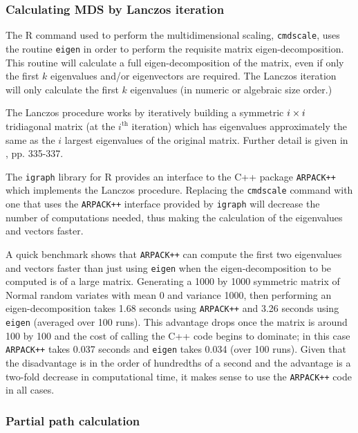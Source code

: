 \subsubsection{Calculating MDS by Lanczos iteration}

The \textsf{R} command used to perform the multidimensional scaling, \texttt{cmdscale}, uses the routine \texttt{eigen} in order to perform the requisite matrix eigen-decomposition. This routine will calculate a full eigen-decomposition of the matrix, even if only the first $k$ eigenvalues and/or eigenvectors are required. The Lanczos iteration will only calculate the first $k$ eigenvalues (in numeric or algebraic size order.)

The  Lanczos procedure works by iteratively building a symmetric $i\times i$ tridiagonal matrix (at the $i^{\text{th}}$ iteration) which has eigenvalues approximately the same as the $i$ largest eigenvalues of the original matrix. Further detail is given in \cite{simonbook}, pp. 335-337.

The \texttt{igraph} library for \textsf{R} provides an interface to the C++ package \texttt{ARPACK++} which implements the Lanczos procedure. Replacing the \texttt{cmdscale} command with one that uses the \texttt{ARPACK++} interface provided by \texttt{igraph} will decrease the number of computations needed, thus making the calculation of the eigenvalues and vectors faster.

A quick benchmark shows that \texttt{ARPACK++} can compute the first two eigenvalues and vectors faster than just using \texttt{eigen} when the eigen-decomposition to be computed is of a large matrix. Generating a 1000 by 1000 symmetric matrix of Normal random variates with mean 0 and variance 1000, then performing an eigen-decomposition takes 1.68 seconds using \texttt{ARPACK++} and 3.26 seconds using \texttt{eigen} (averaged over 100 runs). This advantage drops once the matrix is around 100 by 100 and the cost of calling the C++ code begins to dominate; in this case \texttt{ARPACK++} takes 0.037 seconds and \texttt{eigen} takes 0.034 (over 100 runs). Given that the disadvantage is in the order of hundredths of a second and the advantage is a two-fold decrease in computational time, it makes sense to use the \texttt{ARPACK++} code in all cases.


\subsubsection{Partial path calculation}

